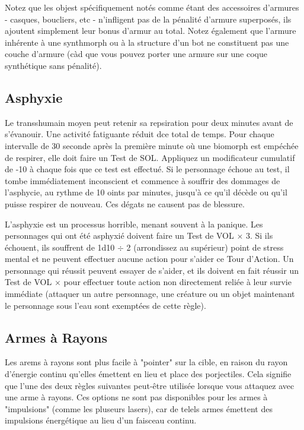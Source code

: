 Notez que les objest spécifiquement notés comme étant des accessoires d'armures - casques, boucliers, etc - n'infligent pas de la pénalité d'armure superposés, ils ajoutent simplement leur bonus d'armur au total. Notez également que l'armure inhérente à une synthmorph ou à la structure d'un bot ne constituent pas une couche d'armure (càd que vous pouvez porter une armure sur une coque synthétique sans pénalité). 

\subsection{Asphyxie} \label{sec:asphyxiation} 

Le transshumain moyen peut retenir sa repsiration pour deux minutes avant de s'évanouir. Une activité fatiguante réduit dce total de temps. Pour chaque intervalle de 30 seconde après la première minute où une biomorph est empéchée de respirer, elle doit faire un Test de SOL. Appliquez un modificateur cumulatif de -10 à chaque fois que ce test est effectué. Si le personnage échoue au test, il tombe immédiatement inconscient et commence à souffrir des dommages de l'asphycie, au rythme de 10 oints par minutes, jusqu'à ce qu'il décède ou qu'il puisse respirer de nouveau. Ces dégats ne causent pas de blessure. 

L'asphyxie est un processus horrible, menant souvent à la panique. Les personnages qui ont été asphyxié doivent faire un Test de VOL $\times$ 3. Si ils échouent, ils souffrent de 1d10 $\div$ 2 (arrondissez au supérieur) point de stress mental et ne peuvent effectuer aucune action pour s'aider ce Tour d'Action. Un personnage qui réussit peuvent essayer de s'aider, et ils doivent en fait réussir un Test de VOL $\times$ pour effectuer toute action non directement reliée à leur survie immédiate (attaquer un autre personnage, une créature ou un objet maintenant le personnage sous l'eau sont exemptées de cette règle). 

\subsection{Armes à Rayons} \label{sec:combat-beam-weapons} 

Les arems à rayons sont plus facile à "pointer" sur la cible, en raison du rayon d'énergie continu qu'elles émettent en lieu et place des porjectiles. Cela signifie que l'une des deux règles suivantes peut-être utilisée lorsque vous attaquez avec une arme à rayons. Ces options ne sont pas disponibles pour les armes à "impulsions" (comme les pluseurs lasers), car de telels armes émettent des impulsions énergétique au lieu d'un faisceau continu. 

